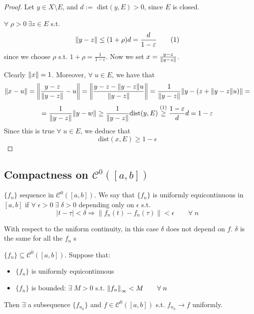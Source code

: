 \begin{proof}
    Let \(y \in X \setminus E\), and \(d := \) dist\((y, E) >0\), since \(E\) is closed. 
    
    \(\forall \; \rho > 0 \ \exists z \in E \) s.t.
    \[
        \norm{y-z} \leq (1+\rho)d = \frac{d}{1-\varepsilon} \tag{1}
    \]
    since we choose \(\rho\) s.t. \(1+\rho = \frac{1}{1-\epsilon}\). Now we set \(x = \frac{y-z}{\norm{y-z}}\).

    Clearly \(\norm{x}=1\). Moreover, \(\forall \; u \in E\), we have that
    \[
        \norm{x-u} = \norm{ \frac{y-z}{\norm{y-z}} - u }
        = \norm{ \frac{y-z -\norm{y-z}u }{\norm{y-z}} }
        = \frac{1}{\norm{y-z}} \norm{y-(z + \norm{y-z}u)} =
    \]
    \[
        = \frac{1}{\norm{y-z}} \norm{y-w}
        \geq \frac{1}{\norm{y-z}} \text{dist}(y, E)
        \overset{(1)}{\geq} \frac{1-\varepsilon}{d} d = 1 - \varepsilon
    \]
    Since this is true \(\forall \; u \in E\), we deduce that
    \[
        \text{dist}(x, E) \geq 1-\epsilon
    \]
\end{proof}

\subsection*{Compactness on \(\mathcal{C}^0(\left[a, b\right])\)}
\begin{definition}
    \(\{f_n\}\) sequence in \(\mathcal{C}^0(\left[a, b\right])\). 
    We say that \(\{f_n\}\) is uniformly equicontinuous in \([a, b]\) if \(\forall \; \epsilon >0 \; \exists \; \delta >0 \) depending only on \(\epsilon \) s.t. 
    \[
        |t-\tau| < \delta \Rightarrow \| f_n(t) - f_n(\tau) \| < \epsilon \qquad \forall \; n
    \]
\end{definition}

\begin{remark}
    With respect to the uniform continuity, in this case \(\delta\) does not depend on \(f\). \(\delta\) is the same for all the \(f_n\) s
\end{remark}

\begin{theorem}
    \(\{f_n\} \subseteq \mathcal{C}^0(\left[a, b\right])\). Suppose that:
    \begin{itemize}
        \item \(\{f_n\}\) is uniformly equicontinuous
        \item \(\{f_n\}\) is bounded: \(\exists \; M>0\) s.t. \(\norm{f_n}_\infty <M \qquad \forall \; n\)
    \end{itemize}
    Then \(\exists\) a subsequence \(\{f_{n_k}\}\) and \(f \in \mathcal{C}^0(\left[a, b\right])\) s.t. \(f_{n_k} \rightarrow f \) uniformly.
\end{theorem}


